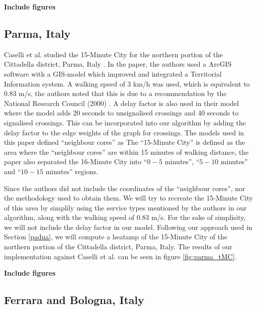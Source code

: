 \textbf{Include figures}

\subsection{Parma, Italy} \label{parma}

Caselli et al. studied the 15-Minute City for the northern portion of the Cittadella district, Parma, Italy \cite{caselli_exploring_2022}. In the paper, the authors used a ArcGIS software with a GIS-model which improved and integrated a Territorial Information system. A walking speed of 3 km/h was used, which is equivalent to 0.83 m/s, the authors noted that this is due to a recommendation by the National Research Council (2000) . A delay factor is also used in their model where the model adds 20 seconds to unsignalised crossings and 40 seconds to signalised crossings. This can be incorporated into our algorithm by adding the delay factor to the edge weights of the graph for crossings. The models used in this paper defined ``neighbour cores'' as  The ``15-Minute City'' is defined as the area where the ``neighbour cores'' are within 15 minutes of walking distance, the paper also separated the 16-Minute City into ``$0 - 5$ minutes'', ``$5 - 10$ minutes'' and ``$10 - 15$ minutes'' regions.

Since the authors did not include the coordinates of the ``neighbour cores'', nor the methodology used to obtain them. We will try to recreate the 15-Minute City of this area by simplily using the service types mentioned by the authors in our algorithm, along with the walking speed of 0.83 m/s. For the sake of simplisity, we will not include the delay factor in our model. Following our approach used in Section \ref{padua}, we will compute a heatamp of the 15-Minute City of the northern portion of the Cittadella district, Parma, Italy. The results of our implementation against Caselli et al. can be seen in figure \ref{fig:parma_tMC}.

\textbf{Include figures}

\subsection{Ferrara and Bologna, Italy}

